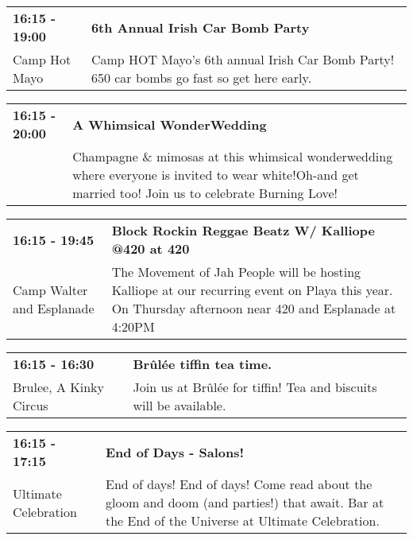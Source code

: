\begin{tabular}{ p{1in} p{2.2in} }
    \textbf{16:15 - 19:00} & \textbf{6th Annual Irish Car Bomb Party} \\
    Camp Hot Mayo \newline  & Camp HOT Mayo's 6th annual Irish Car Bomb Party! 650 car bombs go fast so get here early. \\
    \hline 
\end{tabular}
    
\begin{tabular}{ p{1in} p{2.2in} }
    \textbf{16:15 - 20:00} & \textbf{A Whimsical WonderWedding} \\
    ~ \newline  & Champagne \& mimosas at this whimsical wonderwedding where everyone is invited to wear white!Oh-and get married too! Join us to celebrate Burning Love! \\
    \hline 
\end{tabular}
    
\begin{tabular}{ p{1in} p{2.2in} }
    \textbf{16:15 - 19:45} & \textbf{Block Rockin Reggae Beatz W/ Kalliope @420 at 420} \\
    Camp Walter \newline 420 and Esplanade  & The Movement of Jah People will be hosting Kalliope at our recurring event on Playa this year. On Thursday afternoon near 420 and Esplanade at 4:20PM \\
    \hline 
\end{tabular}
    
\begin{tabular}{ p{1in} p{2.2in} }
    \textbf{16:15 - 16:30} & \textbf{Br\^ul\'ee tiffin tea time.} \\
    Brulee, A Kinky Circus \newline  & Join us at Br\^ul\'ee for tiffin! Tea and biscuits will be available. \\
    \hline 
\end{tabular}
    
\begin{tabular}{ p{1in} p{2.2in} }
    \textbf{16:15 - 17:15} & \textbf{End of Days - Salons!} \\
    Ultimate Celebration \newline  & End of days! End of days! Come read about the gloom and doom (and parties!) that await. Bar at the End of the Universe at Ultimate Celebration. \\
    \hline 
\end{tabular}
    
